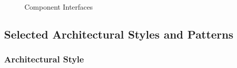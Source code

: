 \documentclass[english]{article}
\begin{document}
\begin{figure}[H]
	\centering
	\caption{Component Interfaces}
	\label{compinterfaces}
\end{figure}

\subsection{Selected Architectural Styles and Patterns}

\subsubsection{Architectural Style}
\end{document}
